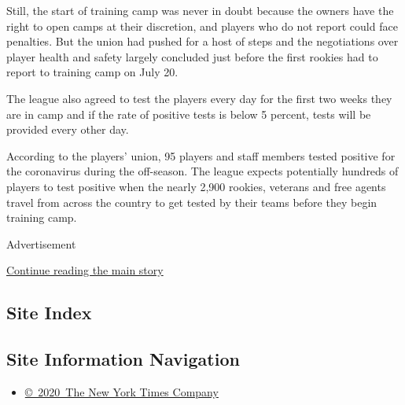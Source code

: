 Still, the start of training camp was never in doubt because the owners
have the right to open camps at their discretion, and players who do not
report could face penalties. But the union had pushed for a host of
steps and the negotiations over player health and safety largely
concluded just before the first rookies had to report to training camp
on July 20.

The league also agreed to test the players every day for the first two
weeks they are in camp and if the rate of positive tests is below 5
percent, tests will be provided every other day.

According to the players' union, 95 players and staff members tested
positive for the coronavirus during the off-season. The league expects
potentially hundreds of players to test positive when the nearly 2,900
rookies, veterans and free agents travel from across the country to get
tested by their teams before they begin training camp.

Advertisement

\protect\hyperlink{after-bottom}{Continue reading the main story}

\hypertarget{site-index}{%
\subsection{Site Index}\label{site-index}}

\hypertarget{site-information-navigation}{%
\subsection{Site Information
Navigation}\label{site-information-navigation}}

\begin{itemize}
\tightlist
\item
  \href{https://help.nytimes3xbfgragh.onion/hc/en-us/articles/115014792127-Copyright-notice}{©~2020~The
  New York Times Company}
\end{itemize}

